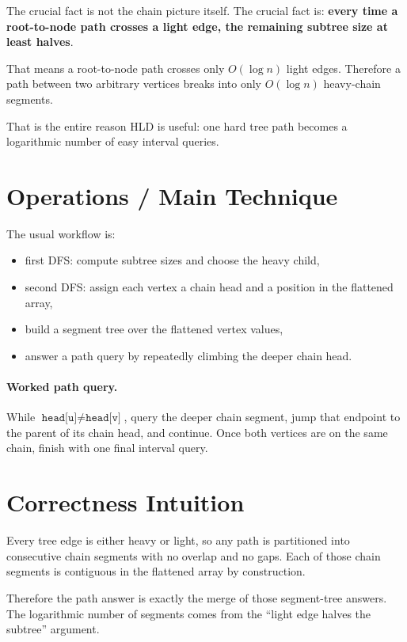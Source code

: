 The crucial fact is not the chain picture itself. The crucial fact is:
\textbf{every time a root-to-node path crosses a light edge, the remaining subtree size at least halves}.

That means a root-to-node path crosses only \(O(\log n)\) light edges. Therefore a path between two arbitrary vertices
breaks into only \(O(\log n)\) heavy-chain segments.

That is the entire reason HLD is useful: one hard tree path becomes a logarithmic number of easy interval queries.

\section*{Operations / Main Technique}

The usual workflow is:

\begin{itemize}
  \item first DFS: compute subtree sizes and choose the heavy child,
  \item second DFS: assign each vertex a chain head and a position in the flattened array,
  \item build a segment tree over the flattened vertex values,
  \item answer a path query by repeatedly climbing the deeper chain head.
\end{itemize}

\paragraph{Worked path query.}
While \(\texttt{head[u]} \neq \texttt{head[v]}\), query the deeper chain segment, jump that endpoint to the parent of
its chain head, and continue. Once both vertices are on the same chain, finish with one final interval query.

\section*{Correctness Intuition}

Every tree edge is either heavy or light, so any path is partitioned into consecutive chain segments with no overlap
and no gaps. Each of those chain segments is contiguous in the flattened array by construction.

Therefore the path answer is exactly the merge of those segment-tree answers. The logarithmic number of segments comes
from the ``light edge halves the subtree'' argument.

